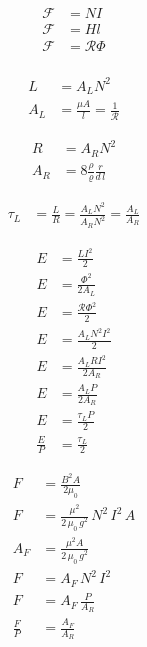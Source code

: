 \documentclass[]{../common/elementary-physics}
\begin{document}
\begin{subequations}
\begin{align}
\mathcal{F} &= N I \\
\mathcal{F} &= H l \\
\mathcal{F} &= \mathcal{R} \Phi \\
\end{align}
\end{subequations}

\begin{subequations}
\begin{align}
L &= A_L N^2 \\
A_L &= \frac{\mu A}{l} = \frac{1}{\mathcal{R}}
\end{align}
\end{subequations}

\begin{subequations}
\begin{align}
R &= A_R N^2 \\
A_R &= 8 \frac{\rho}{\varrho} \frac{r}{d \, l}
\end{align}
\end{subequations}

\begin{subequations}
\begin{align}
\tau_L &= \frac{L}{R} = \frac{A_L N^2}{A_R N^2} = \frac{A_L}{A_R}
\end{align}
\end{subequations}

\begin{subequations}
\begin{align}
E &= \frac{L I^2}{2} \\
E &= \frac{{\Phi}^2}{2 A_L} \\
E &= \frac{\mathcal{R}{\Phi}^2}{2} \\
E &= \frac{A_L N^2 I^2}{2} \\
E &= \frac{A_L R I^2}{2 A_R} \\
E &= \frac{A_L P}{2 A_R} \\
E &= \frac{\tau_L P}{2} \\
\frac{E}{P} &= \frac{\tau_L}{2}
\end{align}
\end{subequations}

\begin{subequations}
\begin{align}
F &= \frac{B^2 A}{2 \mu_0} \\
F &= \frac{\mu^2}{2 \, \mu_0 \, g^2} \, N^2 \, I^2 \, A \\
A_F &= \frac{\mu^2 A}{2 \, \mu_0 \, g^2} \\
F &= A_F \, N^2 \, I^2 \\
F &= A_F \, \frac{P}{A_R} \\
\frac{F}{P} &= \frac{A_F}{A_R}
\end{align}
\end{subequations}
\end{document}
